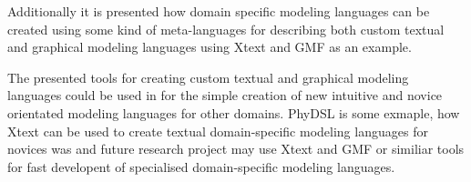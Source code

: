\documentclass[runningheads,a4paper]{llncs}
\begin{document}
Additionally it is presented how domain specific modeling languages can be created using some kind of meta-languages
for describing both custom textual and graphical modeling languages using Xtext and GMF as an example.

The presented tools for creating custom textual and graphical modeling languages could be used in for the simple creation of new intuitive and 
novice orientated modeling languages for other domains. PhyDSL is some exmaple, how Xtext can be used to create textual domain-specific modeling languages 
for novices was and future research project may use Xtext and GMF or similiar tools for fast developent of specialised domain-specific modeling languages.  

% 
% 

%
%
\printbibliography
\end{document}
